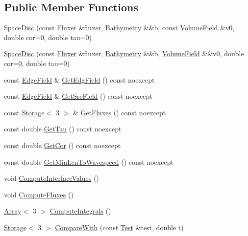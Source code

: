 \subsection*{Public Member Functions}
\begin{DoxyCompactItemize}
\item 
\hyperlink{structSpaceDisc_a69bc32c19f0e0392d65463de812818e5}{Space\+Disc} (const \hyperlink{structSpaceDisc_a96fbebf5dd4659e2dcc144a5debc861d}{Fluxer} \&fluxer, \hyperlink{structBathymetry}{Bathymetry} \&\&b, const \hyperlink{ValueField_8h_a329043a10c46a8722ea79ba24fe40f97}{Volume\+Field} \&v0, double cor=0, double tau=0)
\item 
\hyperlink{structSpaceDisc_a3bc2b6463824bfb7f43235dec457f1ce}{Space\+Disc} (const \hyperlink{structSpaceDisc_a96fbebf5dd4659e2dcc144a5debc861d}{Fluxer} \&fluxer, \hyperlink{structBathymetry}{Bathymetry} \&\&b, \hyperlink{ValueField_8h_a329043a10c46a8722ea79ba24fe40f97}{Volume\+Field} \&\&v0, double cor=0, double tau=0)
\item 
const \hyperlink{ValueField_8h_afe95c3cf57931e46528822035916f101}{Edge\+Field} \& \hyperlink{structSpaceDisc_abb77eee64defc868e9ddcb9e7ab74dc7}{Get\+Edg\+Field} () const noexcept
\item 
const \hyperlink{ValueField_8h_afe95c3cf57931e46528822035916f101}{Edge\+Field} \& \hyperlink{structSpaceDisc_ad92de02d3ac084f5545177e5dbad3fe2}{Get\+Src\+Field} () const noexcept
\item 
const \hyperlink{Includes_8h_ae7d375db701e28425a3faea2827f134b}{Storage}$<$ 3 $>$ \& \hyperlink{structSpaceDisc_a99a97193afb313b64ea56205ac3a35c5}{Get\+Fluxes} () const noexcept
\item 
const double \hyperlink{structSpaceDisc_ab5d1e593defca1bd66222feb14d50c14}{Get\+Tau} () const noexcept
\item 
const double \hyperlink{structSpaceDisc_a6ad21f7074f4acc9ab9af1f174886f34}{Get\+Cor} () const noexcept
\item 
const double \hyperlink{structSpaceDisc_a156dcd96d37a1a7b8d55511ad7e36cb2}{Get\+Min\+Len\+To\+Wavespeed} () const noexcept
\item 
void \hyperlink{structSpaceDisc_ae25fa39b08a67210ca0dc2339033e1e6}{Compute\+Interface\+Values} ()
\item 
void \hyperlink{structSpaceDisc_a24d17843bb599b8359e17e647ecb3819}{Compute\+Fluxes} ()
\item 
\hyperlink{Includes_8h_abd9de33944f934950000c3929e14ad8d}{Array}$<$ 3 $>$ \hyperlink{structSpaceDisc_a5f5179fe58a3d92f834680a6e2815022}{Compute\+Integrals} ()
\item 
\hyperlink{Includes_8h_ae7d375db701e28425a3faea2827f134b}{Storage}$<$ 3 $>$ \hyperlink{structSpaceDisc_adeaf3b111301eb2d4fa845ce89aca9c7}{Compare\+With} (const \hyperlink{classTest}{Test} \&test, double t)
\end{DoxyCompactItemize}
